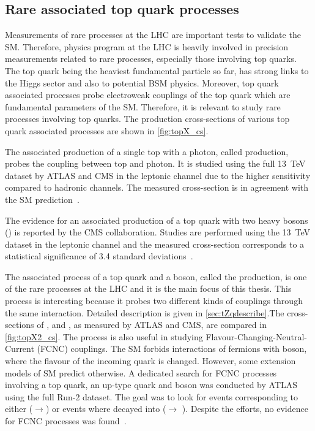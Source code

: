 \subsection{Rare associated top quark processes}
Measurements of rare processes at the LHC are important tests to validate the SM. Therefore,
physics program at the LHC is heavily involved in precision measurements related to rare processes,
especially those involving top quarks. 
The top quark being the heaviest fundamental particle so far, has strong links to the Higgs
sector and also to potential BSM physics. Moreover, top quark associated processes probe 
electroweak couplings of the top quark which are fundamental parameters of the SM. 
Therefore, it is relevant to study rare processes involving top quarks. The production 
cross-sections of various top quark associated processes are shown in \cref{fig:topX_cs}.

The associated production of a single top with a photon, called \tqgamma production, probes
the coupling between top and photon. It is studied using the full \SI{13}{\TeV} dataset by ATLAS
and CMS in the leptonic channel due to the higher sensitivity compared to hadronic channels. The
measured cross-section is in agreement with the SM prediction~\cite{PhysRevLett.131.181901}.

The evidence for an associated production of a top quark with two heavy bosons (\tWZ) is 
reported by the CMS collaboration. Studies are performed using the \SI{13}{\TeV} dataset
in the leptonic channel and the measured cross-section corresponds to a statistical
significance of 3.4 standard deviations~\cite{CMS:2023krq}. 

The associated process of a top quark and a \PZ boson, called the \tZq production,
is one of the rare processes at the LHC and it is the main focus of this thesis. This process
is interesting because it probes two different kinds of couplings through the same interaction.
Detailed description is given in \cref{sec:tZqdescribe}.The cross-sections of \tZq, \tWZ and 
\tqgamma, as measured by ATLAS and CMS, are compared in \cref{fig:topX2_cs}. 
The \tZq process is also useful in
studying Flavour-Changing-Neutral-Current (FCNC) couplings. The SM forbids 
interactions of fermions with \PZ boson, where the flavour of the incoming quark is changed. 
However, some extension models of SM predict otherwise. A dedicated search for FCNC processes involving
a top quark, an up-type quark and \PZ boson was conducted by ATLAS using the full Run-2 dataset.
The goal was to look for events corresponding to either (\Pgluon{}\Pq$\rightarrow$\Ptop{}\PZ)
or events where \Ptop decayed into \PZ (\Ptop $\rightarrow$ \Pq{}\PZ). Despite the efforts, no 
evidence for FCNC processes was found~\cite{ATLAS:2023qzr}.

